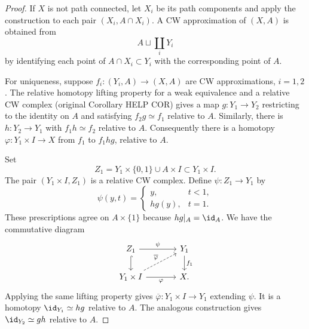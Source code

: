 \begin{proof}
If $X$ is not path connected, let $X_i$ be its path components and apply the
construction to each pair $(X_i,A\cap X_i)$. A CW approximation of $(X,A)$ is
obtained from
\[
 A\sqcup\coprod_iY_i
\]
by identifying each point of $A\cap X_i\subset Y_i$ with the corresponding
point of $A$.

For uniqueness, suppose $f_i:(Y_i,A)\to(X,A)$ are CW approximations,
$i=1,2$. The relative homotopy lifting property for a weak equivalence and
a relative CW complex (original Corollary HELP COR) gives a map
$g:Y_1\to Y_2$ restricting to the identity on $A$ and satisfying
$f_2g\simeq f_1$ relative to $A$. Similarly, there is $h:Y_2\to Y_1$
with $f_1h\simeq f_2$ relative to $A$. Consequently there is a homotopy
$\varphi:Y_1\times I\to X$ from $f_1$ to $f_1hg$, relative to $A$.

Set
\[
 Z_1=Y_1\times\{0,1\}\cup A\times I\subset Y_1\times I.
\]
The pair $(Y_1\times I,Z_1)$ is a relative CW complex. Define
$\psi:Z_1\to Y_1$ by
\[
 \psi(y,t)=\begin{cases}y,&t<1,\\hg(y),&t=1.\end{cases}
\]
These prescriptions agree on $A\times\{1\}$ because $hg|_A=\id_A$.
We have the commutative diagram
\[
\begin{tikzcd}[column sep=large]
Z_1 \arrow[r,"\psi"] \arrow[d,hook] &Y_1\arrow[d,"f_1"]\\
Y_1\times I \arrow[r,"\varphi"'] \arrow[ur,dashed,"\overline\varphi"] & X.
\end{tikzcd}
\]
Applying the same lifting property gives $\overline\varphi:Y_1\times I\to Y_1$
extending $\psi$. It is a homotopy $\id_{Y_1}\simeq hg$ relative to $A$.
The analogous construction gives $\id_{Y_2}\simeq gh$ relative to $A$.
\end{proof}
